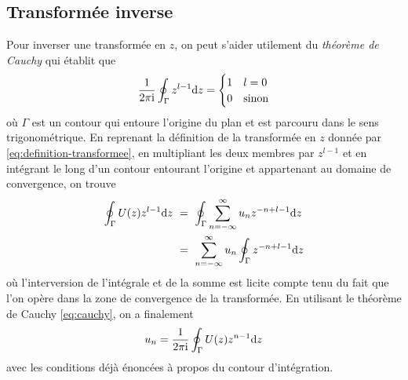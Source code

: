 \subsection{Transformée inverse}
Pour inverser une transform\'{e}e en $z$, on peut s'aider utilement du \emph{théorème de Cauchy} qui \'{e}tablit que
\begin{equation}
\label{eq:cauchy}
\frac{1}{2\pi \mathrm{i}}\oint_{\Gamma}z^{l-1}\mathrm{d}  z= \begin{cases} 1 & l= 0 \\ 0 & \text{sinon} \end{cases}
\end{equation}
o\`{u} $\Gamma$ est un contour qui entoure l'origine du plan et est parcouru dans le sens trigonométrique. En reprenant la d\'{e}finition de la transform\'{e}e en $z$ donn\'{e}e par \eqref{eq:definition-transformee}, en multipliant les deux membres par $z^{l-1}$ et en int\'{e}grant le long d'un contour entourant l'origine et appartenant au domaine de convergence, on trouve
\begin{align*}
\oint_{\Gamma}U(z)z^{l-1}\rmd z\ &=\ \oint_{\Gamma}\sum_{n=-\infty}^{\infty} u_n z^{-n+l-1}\rmd z \\
&=\ \sum_{n=-\infty}^{\infty} u_n \oint_{\Gamma}z^{-n+l-1}\rmd z
\end{align*}
o\`{u} l'interversion de l'int\'{e}grale et de la somme est licite compte tenu du fait que l'on op\`{e}re dans la zone de convergence de la transform\'{e}e. En utilisant le th\'{e}or\`{e}me de Cauchy \eqref{eq:cauchy}, on a finalement
\begin{equation}
\label{eq:inverse-z}
u_n=\frac{1}{2\pi \mathrm{i}}\oint_{\Gamma} U(z)z^{n-1}\mathrm{d} z
\end{equation}
avec les conditions d\'{e}j\`{a} \'{e}nonc\'{e}es \`{a} propos du contour d'int\'{e}gration.

